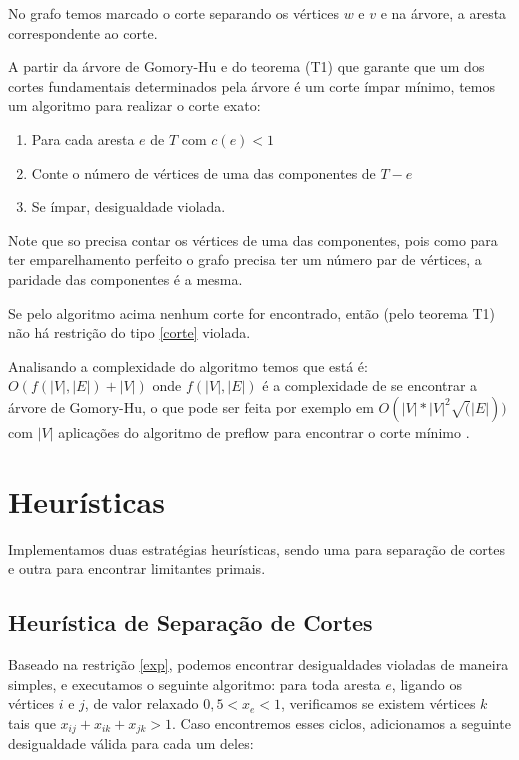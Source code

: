 \documentclass[11pt]{article}
\begin{document}
No grafo temos marcado o corte separando os vértices $w$ e $v$ e na
árvore, a aresta correspondente ao corte.

A partir da árvore de Gomory-Hu e do teorema (T1) que garante que um dos
cortes fundamentais determinados pela árvore é um corte ímpar mínimo,
temos um algoritmo para realizar o corte exato:

\begin{enumerate}
  \item Para cada aresta $e$ de $T$ com $c(e) < 1$
  \item Conte o número de vértices de uma das componentes de $T-e$
  \item Se ímpar, desigualdade violada.
\end{enumerate}

Note que so precisa contar os vértices de uma das componentes, pois
como para ter emparelhamento perfeito o grafo precisa ter um número
par de vértices, a paridade das componentes é a mesma.

Se pelo algoritmo acima nenhum corte for encontrado, então (pelo
teorema T1) não há restrição do tipo \eqref{corte} violada.

Analisando a complexidade do algoritmo temos que está é: $O(f(|V|,
|E|) + |V|)$ onde $f(|V|,|E|)$ é a complexidade de se encontrar a árvore
de Gomory-Hu, o que pode ser feita por exemplo em $O(|V|*|V|^2\sqrt(|E|))$ com
$|V|$ aplicações do algoritmo de preflow para encontrar o corte mínimo
\cite{schrijver2003cop}.

\section{Heurísticas}

Implementamos duas estratégias heurísticas, sendo uma para separação de
cortes e outra para encontrar limitantes primais. 

\subsection{Heurística de Separação de Cortes}

Baseado na restrição \eqref{exp}, podemos encontrar desigualdades
violadas de maneira simples, e executamos o seguinte algoritmo: para
toda aresta $e$, ligando os vértices $i$ e $j$, de valor relaxado \( 0,5
< x_e < 1 \), verificamos se existem vértices $k$ tais que \( x_{ij} +
x_{ik} + x_{jk} > 1 \). Caso encontremos esses ciclos, adicionamos a
seguinte desigualdade válida para cada um deles: 
\end{document}
